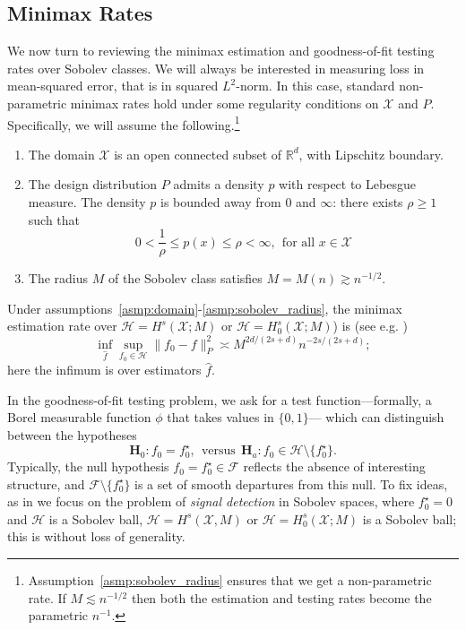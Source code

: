 \documentclass{article}
\newcommand{\Reals}{\mathbb{R}}
\newcommand{\1}{\mathbf{1}}
\newcommand{\Rd}{\Reals^d}
\newcommand{\Xset}{\mathcal{X}}
\newcommand{\Leb}{L}
\newcommand{\mc}[1]{\mathcal{#1}}
\newcommand{\wh}[1]{\widehat{#1}}
\theoremstyle{alden}
\theoremstyle{aldenthm}
\theoremstyle{definition}
\theoremstyle{remark}
\begin{document}
\subsection{Minimax Rates}
\label{subsec:minimax_rates_sobolev}
We now turn to reviewing the minimax estimation and goodness-of-fit testing rates over Sobolev classes. We will always be interested in measuring loss in mean-squared error, that is in squared $\Leb^2$-norm. In this case, standard non-parametric minimax rates hold under some regularity conditions on $\mc{X}$ and $P$. Specifically, we will assume the following.\footnote{Assumption~\ref{asmp:sobolev_radius} ensures that we get a non-parametric rate. If $M \lesssim n^{-1/2}$ then both the estimation and testing rates become the parametric $n^{-1}$.}
\begin{enumerate}[label=(A\arabic*)]
	\item 
	\label{asmp:domain}
	The domain $\mc{X}$ is an open connected subset of $\Rd$, with Lipschitz boundary.
	\item
	\label{asmp:density}
	The design distribution $P$ admits a density $p$ with respect to Lebesgue measure. The density $p$ is bounded away from $0$ and $\infty$: there exists $\rho \geq 1$ such that
	\begin{equation*}
	0 < \frac{1}{\rho} \leq p(x) \leq \rho < \infty,~~\textrm{for all $x \in \mc{X}$}
	\end{equation*}
	\item
	\label{asmp:sobolev_radius}
	The radius $M$ of the Sobolev class satisfies $M = M(n) \gtrsim n^{-1/2}$.
\end{enumerate}
Under assumptions~\ref{asmp:domain}-\ref{asmp:sobolev_radius}, the minimax estimation rate over $\mc{H} = H^s(\mc{X};M)$ or $\mc{H} = H_0^s(\mc{X};M)$) is (see e.g. \citet{tsybakov2008_book})
\begin{equation}
\label{eqn:minimax_estimation_rate}
\inf_{\wh{f}} \sup_{f_0 \in \mc{H}} \|f_0 - f\|_P^2 \asymp M^{2d/(2s + d)}n^{-2s/(2s + d)};
\end{equation}
here the infimum is over estimators $\wh{f}$. 

In the goodness-of-fit testing problem, we ask for a test function---formally, a Borel measurable function $\phi$ that takes values in $\{0,1\}$--- which can distinguish between the hypotheses
\begin{equation}
\mathbf{H}_0: f_0 = f_0^{\star}, ~~\textrm{versus}~~ \mathbf{H}_a: f_0 \in \mc{H} \setminus \{f_0^{\star}\}.
\end{equation} 
Typically, the null hypothesis $f_0 = f_0^{\star} \in \mc{F}$ reflects the absence of interesting structure, and $\mc{F} \setminus  \{f_0^{\star}\}$ is a set of smooth departures from this null. To fix ideas, as in \citet{ingster2009} we focus on the problem of \emph{signal detection} in Sobolev spaces, where $f_0^{\star} = 0$ and $\mc{H}$ is a Sobolev ball, $\mc{H} = H^s(\Xset,M)$ or $\mc{H} = H_0^s(\mc{X};M)$ is a Sobolev ball; this is without loss of generality.
\end{document}
